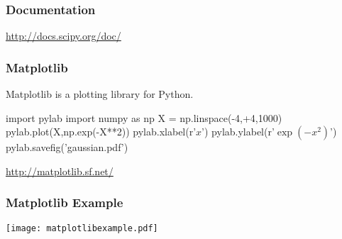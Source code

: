 \begin{frame}[fragile]
\frametitle{Documentation}

\href{http://docs.scipy.org/doc/}{http://docs.scipy.org/doc/}

\end{frame}

\begin{frame}[fragile]
\frametitle{Matplotlib}
Matplotlib is a \alert{plotting library} for Python.

\begin{python}
import pylab
import numpy as np
X = np.linspace(-4,+4,1000)
pylab.plot(X,np.exp(-X**2))
pylab.xlabel(r'$x$')
pylab.ylabel(r'$\exp(-x^{2})$')
pylab.savefig('gaussian.pdf')
\end{python}

\centering
\href{http://matplotlib.sf.net/}{http://matplotlib.sf.net/}

\end{frame}

\begin{frame}[fragile]
\frametitle{Matplotlib Example}

\centering
\texttt{[image: matplotlibexample.pdf]}

\end{frame}


